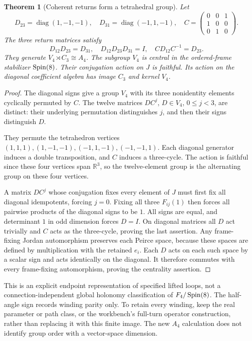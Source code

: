 \documentclass[11pt]{article}
\newtheorem{theorem}{Theorem}[section]
\theoremstyle{definition}\newtheorem{definition}[theorem]{Definition}
\newcommand{\R}{\mathbb R}\newcommand{\Q}{\mathbb Q}\newcommand{\Z}{\mathbb Z}
\begin{document}
\begin{theorem}[Coherent returns form a tetrahedral group]\label{thm:tetrahedral}
Let
\[
 D_{23}=\operatorname{diag}(1,-1,-1),\quad
 D_{31}=\operatorname{diag}(-1,1,-1),\quad
 C=\begin{pmatrix}0&0&1\\1&0&0\\0&1&0\end{pmatrix}.
\]
The three return matrices satisfy
\[
 D_{12}D_{23}=D_{31},\quad D_{12}D_{23}D_{31}=I,\quad
 CD_{12}C^{-1}=D_{23}.
\]
They generate $V_4\rtimes C_3\cong A_4$. The subgroup $V_4$ is central in the ordered-frame stabilizer $\operatorname{Spin}(8)$. Their conjugation action on $J$ is faithful. Its action on the diagonal coefficient algebra has image $C_3$ and kernel $V_4$.
\end{theorem}
\begin{proof}
The diagonal signs give a group $V_4$ with its three nonidentity elements cyclically permuted by $C$. The twelve matrices $DC^j$, $D\in V_4$, $0\le j<3$, are distinct: their underlying permutation distinguishes $j$, and then their signs distinguish $D$.

They permute the tetrahedron vertices $(1,1,1),(1,-1,-1),(-1,1,-1),(-1,-1,1)$. Each diagonal generator induces a double transposition, and $C$ induces a three-cycle. The action is faithful since these four vertices span $\R^3$, so the twelve-element group is the alternating group on these four vertices.

A matrix $DC^j$ whose conjugation fixes every element of $J$ must first fix all diagonal idempotents, forcing $j=0$. Fixing all three $F_{ij}(1)$ then forces all pairwise products of the diagonal signs to be $1$. All signs are equal, and determinant $1$ in odd dimension forces $D=I$. On diagonal matrices all $D$ act trivially and $C$ acts as the three-cycle, proving the last assertion. Any frame-fixing Jordan automorphism preserves each Peirce space, because these spaces are defined by multiplication with the retained $e_i$. Each $D$ acts on each such space by a scalar sign and acts identically on the diagonal. It therefore commutes with every frame-fixing automorphism, proving the centrality assertion.
\end{proof}

This is an explicit endpoint representation of specified lifted loops, not a connection-independent global holonomy classification of $F_4/\operatorname{Spin}(8)$. The half-angle sign records winding parity only. To retain every winding, keep the real parameter or path class, or the workbench's full-turn operator construction, rather than replacing it with this finite image. The new $A_4$ calculation does not identify group order with a vector-space dimension.
\end{document}
